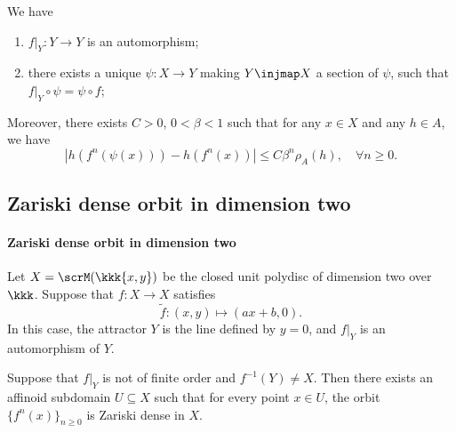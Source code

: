     \begin{theorem}[
        title={{ref. \cite[Theorem 8.3]{Xie-2025-ExistenceZariskiDense}}}, 
        label=thm:attractor-is-Zariski-closed-and-endomorphism-descends
        ]
        We have
        \begin{enumerate}
            \item \(f|_{Y}: Y \to Y\) is an automorphism;
            \item there exists a unique \(\psi: X \to Y\) making \(Y \injmap X\) a section of \(\psi\),
                such that \(f|_{Y} \circ \psi = \psi \circ f\);
        \end{enumerate}
        Moreover, there exists \(C>0\), \(0 < \beta < 1\) such that for any \(x \in X\) and any \(h \in A\), we have
        \[ |h(f^n(\psi(x))) - h(f^n(x))| \leq C \beta^n \rho_A(h), \quad \forall n \geq 0. \]
    \end{theorem}

\subsection{Zariski dense orbit in dimension two}

    \paragraph{Zariski dense orbit in dimension two}
    Let \(X = \scrM(\kkk{x,y})\) be the closed unit polydisc of dimension two over \(\kkk\).
    Suppose that \(f: X \to X\) satisfies
    \[ \tilde{f}: (x,y) \mapsto (a x + b, 0). \]
    In this case, the attractor \(Y\) is the line defined by \(y = 0\), and \(f|_{Y}\) is an automorphism of \(Y\).

    \begin{proposition}\label{prop:local_ZDO_of_surface}
        Suppose that \(f|_{Y}\) is not of finite order and \(f^{-1}(Y) \neq X\).
        Then there exists an affinoid subdomain \(U \subseteq X\) such that for every point \(x \in U\), the orbit \(\{ f^n(x) \}_{n \geq 0}\) is Zariski dense in \(X\).
        \Yang{}
    \end{proposition}
